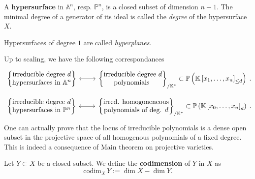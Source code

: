 \begin{defn}[Hypersurface]
	A \textbf{hypersurface} in $\mathbb{A}^{n}$, resp. $\mathbb{P}^{n}$, is a closed subset of dimension $n-1$.
	The minimal degree of a generator of its ideal is called the \textit{degree} of the hypersurface $X$.

	Hypersurfaces of degree $1$ are called \textit{hyperplanes}.
\end{defn}

\begin{rem}[]
	Up to scaling, we have the following correspondances
	\begin{equation}
	\begin{tikzcd}
		\left\{ 
		\begin{matrix}
		\text{irreducible degree } d\\
		\text{hypersurfaces in } \mathbb{A}^{n}
		\end{matrix} 
		\right\} \arrow[r, "", leftrightarrow] &
		\left\{ 
		\begin{matrix}
		\text{irreducible degree } d\\
		\text{polynomials }
		\end{matrix} 
		\right\}_{/ \K^*}
		\subset \mathbb{P} \left( \mathbb{K}\left[x_1, \ldots, x_n \right]_{\leq d} \right)
	\end{tikzcd}
	.\end{equation} 
	\begin{equation}
	\begin{tikzcd}
		\left\{ 
		\begin{matrix}
		\text{irreducible degree } d\\
		\text{hypersurfaces in } \mathbb{P}^{n}
		\end{matrix} 
		\right\} \arrow[r, "", leftrightarrow] &
		\left\{ 
		\begin{matrix}
		\text{irred. homogoneneous}\\
		\text{polynomials of deg. } d 
		\end{matrix} 
		\right\}_{/ \K^*}
		\subset \mathbb{P} \left( \mathbb{K}\left[x_0, \ldots, x_n \right]_{d} \right)
	\end{tikzcd}
	.\end{equation} 
	One can actually prove that the locus of irreducible polynomials is a dense open subset
	in the projective space of all homogenous polynomials of a fixed degree.
	This is indeed a consequence of Main theorem on projective varieties.
\end{rem}

\begin{defn}[Codimension]
	Let $Y \subset X$ be a closed subset.
	We define the \textbf{codimension} of $Y$ in $X$ as
	\begin{equation}
	\mathrm{codim}_X\, Y := \dim X - \dim Y
	.\end{equation} 
\end{defn}

